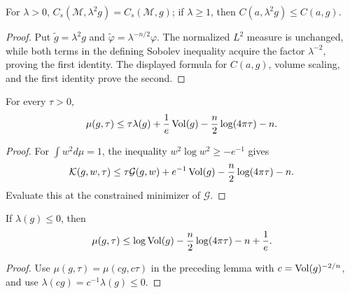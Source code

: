 \begin{lemma}
\label{lem:chow-iii-ch17-sobolev-scaling}

For $\lambda>0$,
$C_s(\mathcal M,\lambda^2g)=C_s(\mathcal M,g)$; if $\lambda\ge1$, then
$C(a,\lambda^2g)\le C(a,g)$.
\end{lemma}
\begin{proof}
\sketch Put $\widetilde g=\lambda^2g$ and
$\widetilde\varphi=\lambda^{-n/2}\varphi$.  The normalized $L^2$ measure is
unchanged, while both terms in the defining Sobolev inequality acquire the
factor $\lambda^{-2}$, proving the first identity.  The displayed formula
for $C(a,g)$, volume scaling, and the first identity prove the second.
\end{proof}

\begin{lemma}
\label{lem:chow-iii-ch17-mu-upper-lambda-volume}


For every $\tau>0$,
\[
 \mu(g,\tau)\le\tau\lambda(g)+\frac1e\operatorname{Vol}(g)
 -\frac n2\log(4\pi\tau)-n.
\]
\end{lemma}
\begin{proof}
\sketch For $\int w^2d\mu=1$, the inequality
$w^2\log w^2\ge-e^{-1}$ gives
\[
 \mathcal K(g,w,\tau)\le \tau\mathcal G(g,w)+e^{-1}\operatorname{Vol}(g)
 -\frac n2\log(4\pi\tau)-n.
\]
Evaluate this at the constrained minimizer of $\mathcal G$.
\end{proof}

\begin{corollary}
\label{cor:chow-iii-ch17-mu-upper-nonpositive-lambda}


If $\lambda(g)\le0$, then
\[
 \mu(g,\tau)\le\log\operatorname{Vol}(g)-\frac n2\log(4\pi\tau)-n+\frac1e.
\]
\end{corollary}
\begin{proof}
\sketch Use $\mu(g,\tau)=\mu(cg,c\tau)$ in the preceding lemma with
$c=\operatorname{Vol}(g)^{-2/n}$, and use $\lambda(cg)=c^{-1}\lambda(g)\le0$.
\end{proof}

